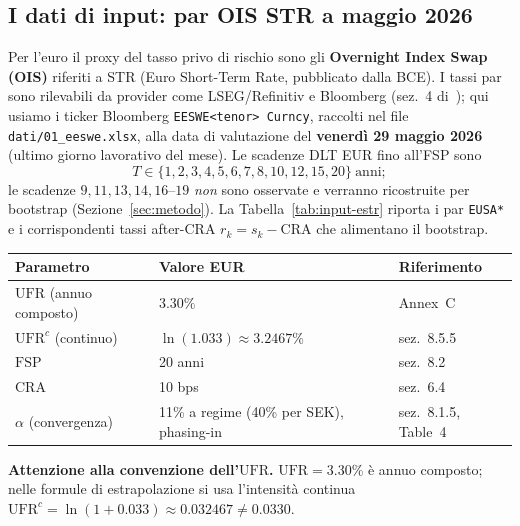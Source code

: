 \documentclass[11pt,a4paper]{article}
\theoremstyle{plain}
\theoremstyle{definition}
\theoremstyle{remark}
\newcommand{\UFR}{\mathrm{UFR}}
\newcommand{\FSP}{\mathrm{FSP}}
\newcommand{\CRA}{\mathrm{CRA}}
\newcommand{\estr}{\texteuro{}STR}
\begin{document}
\subsection{I dati di input: par OIS \estr{} a maggio 2026}
\label{sec:dati-input}

Per l'euro il proxy del tasso privo di rischio sono gli \textbf{Overnight Index Swap (OIS)}
riferiti a \estr{} (Euro Short-Term Rate, pubblicato dalla BCE). I tassi par sono rilevabili
da provider come LSEG/Refinitiv e Bloomberg (sez.~4 di~\cite{eiopa2026}); qui usiamo i ticker
Bloomberg \texttt{EESWE<tenor> Curncy}, raccolti nel file \texttt{dati/01\_eeswe.xlsx}, alla
data di valutazione del \textbf{venerd\`i 29 maggio 2026} (ultimo giorno lavorativo del mese).
Le scadenze DLT EUR fino all'FSP sono
\[
  T \in \{1,2,3,4,5,6,7,8,10,12,15,20\}\ \text{anni};
\]
le scadenze $9,11,13,14,16$--$19$ \emph{non} sono osservate e verranno ricostruite per
bootstrap (Sezione~\ref{sec:metodo}). La Tabella~\ref{tab:input-estr} riporta i par \texttt{EUSA*}
e i corrispondenti tassi after-CRA $r_k=s_k-\CRA$ che alimentano il bootstrap.



\begin{keybox}
\begin{center}
\renewcommand{\arraystretch}{1.25}
\begin{tabular}{lll}
\toprule
\textbf{Parametro} & \textbf{Valore EUR} & \textbf{Riferimento} \\
\midrule
$\UFR$ (annuo composto) & $3.30\%$ & Annex~C \\
$\UFR^c$ (continuo) & $\ln(1.033) \approx 3.2467\%$ & sez.~8.5.5 \\
$\FSP$ & 20 anni & sez.~8.2 \\
$\CRA$ & 10 bps & sez.~6.4 \\
$\alpha$ (convergenza) & 11\% a regime (40\% per SEK), phasing-in & sez.~8.1.5, Table~4 \\
\bottomrule
\end{tabular}
\end{center}
\textbf{Attenzione alla convenzione dell'$\UFR$.} $\UFR=3.30\%$ \`e annuo composto; nelle
formule di estrapolazione si usa l'intensit\`a continua
$\UFR^c=\ln(1+0.033)\approx 0.032467 \neq 0.0330$.
\end{keybox}
\end{document}
